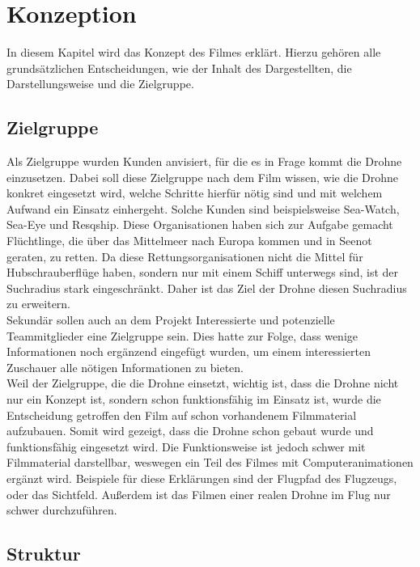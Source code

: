 \chapter{Konzeption}
\label{ch:intro}
In diesem Kapitel wird das Konzept des Filmes erklärt. Hierzu gehören alle grundsätzlichen Entscheidungen, wie der Inhalt des Dargestellten, die Darstellungsweise und die Zielgruppe.

\section{Zielgruppe}
\label{sec:konzept:zielgruppe}


Als Zielgruppe wurden Kunden anvisiert, für die es in Frage kommt die Drohne einzusetzen. Dabei soll diese Zielgruppe nach dem Film wissen, wie die Drohne konkret eingesetzt wird, welche Schritte hierfür nötig sind und mit welchem Aufwand ein Einsatz einhergeht. Solche Kunden sind beispielsweise Sea-Watch, Sea-Eye und Resqship. Diese Organisationen haben sich zur Aufgabe gemacht Flüchtlinge, die über das Mittelmeer nach Europa kommen und in Seenot geraten, zu retten. Da diese Rettungsorganisationen nicht die Mittel für Hubschrauberflüge haben, sondern nur mit einem Schiff unterwegs sind, ist der Suchradius stark eingeschränkt. Daher ist das Ziel der Drohne diesen Suchradius zu erweitern. \\
Sekundär sollen auch an dem Projekt Interessierte und potenzielle Teammitglieder eine Zielgruppe sein. Dies hatte zur Folge, dass wenige Informationen noch ergänzend eingefügt wurden, um einem interessierten Zuschauer alle nötigen Informationen zu bieten.\\
Weil der Zielgruppe, die die Drohne einsetzt, wichtig ist, dass die Drohne nicht nur ein Konzept ist, sondern schon funktionsfähig im Einsatz ist, wurde die Entscheidung getroffen den Film auf schon vorhandenem Filmmaterial aufzubauen. Somit wird gezeigt, dass die Drohne schon gebaut wurde und funktionsfähig eingesetzt wird. Die Funktionsweise ist jedoch schwer mit Filmmaterial darstellbar, weswegen ein Teil des Filmes mit Computeranimationen ergänzt wird. Beispiele für diese Erklärungen sind der Flugpfad des Flugzeugs, oder das Sichtfeld. Außerdem ist das Filmen einer realen Drohne im Flug nur schwer durchzuführen.

\section{Struktur} %
\label{sec:konzept:outline}

